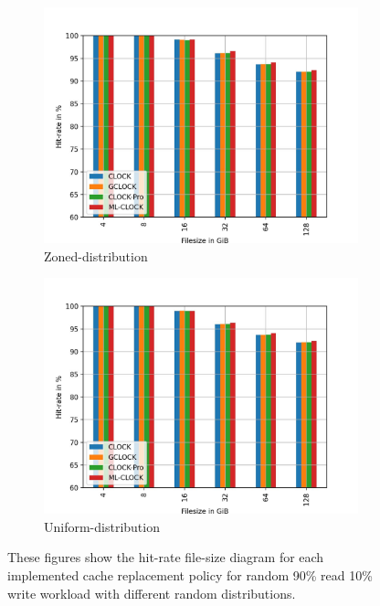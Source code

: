 \documentclass[
	12pt,
	a4paper,
	abstract,
	bibliography=totoc,
	chapterprefix,
	headings=openright,
	numbers=endperiod,
	parskip=half,
	twoside,
]{scrreprt}
\begin{document}
\begin{figure}[H]
\begin{subfigure}{0.4\textwidth}
		\includegraphics[width=\textwidth]{rw_90to10_zoned.jpg}		
		\caption{Zoned-distribution}
		\label{fig:rw_90to10  zoned}
	\end{subfigure}
	\hfill
	\begin{subfigure}{0.4\textwidth}
		\includegraphics[width=\textwidth]{rw_90to10_uniform.jpg}		
		\caption{Uniform-distribution}
		\label{fig:rw_90to10  uniform}
	\end{subfigure}
	\caption{These figures show the hit-rate file-size diagram for each implemented 		cache replacement policy for random 90\% read 10\% write workload with different random distributions.}
\end{figure}

\end{document}
